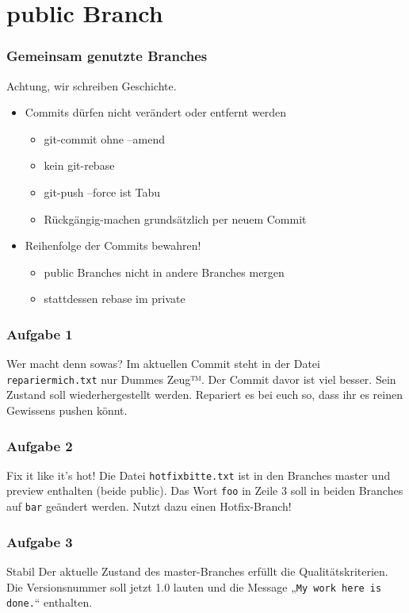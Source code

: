 \documentclass{beamer}
\begin{document}
\section{public Branch}

\begin{frame}
	\frametitle{Gemeinsam genutzte Branches}
	\begin{block}{Achtung, wir schreiben Geschichte.}
		\begin{itemize}
			\item Commits dürfen nicht verändert oder entfernt werden
				\begin{itemize}
					\item git-commit ohne --amend
					\item kein git-rebase
					\item git-push --force ist Tabu
					\item Rückgängig-machen grundsätzlich per neuem Commit
				\end{itemize}
			\item Reihenfolge der Commits bewahren!
				\begin{itemize}
					\item public Branches nicht in andere Branches mergen
					\item stattdessen rebase im private
				\end{itemize}
		\end{itemize}
	\end{block}
\end{frame}

\begin{frame}
	\frametitle{Aufgabe 1}
	\begin{block}{Wer macht denn sowas?}
		Im aktuellen Commit steht in der Datei \texttt{repariermich.txt} nur Dummes Zeug™.
		Der Commit davor ist viel besser.
		Sein Zustand soll wiederhergestellt werden.
		Repariert es bei euch so, dass ihr es reinen Gewissens pushen könnt.
	\end{block}
\end{frame}

\begin{frame}
	\frametitle{Aufgabe 2}
	\begin{block}{Fix it like it’s hot!}
		Die Datei \texttt{hotfixbitte.txt} ist in den Branches master und preview enthalten (beide public).
		Das Wort \texttt{foo} in Zeile 3 soll in beiden Branches auf \texttt{bar} geändert werden.
		Nutzt dazu einen Hotfix-Branch!
	\end{block}
\end{frame}

\begin{frame}
	\frametitle{Aufgabe 3}
	\begin{block}{Stabil}
		Der aktuelle Zustand des master-Branches erfüllt die Qualitätskriterien.
		Die Versionsnummer soll jetzt 1.0 lauten und die Message „\texttt{My work here is done.}“ enthalten.
	\end{block}
\end{frame}
\end{document}
